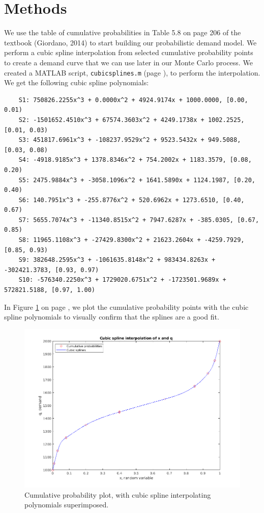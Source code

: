 \documentclass{article}
\begin{document}
    \section*{Methods}
    We use the table of cumulative probabilities in Table 5.8 on page 206 of the textbook (Giordano, 2014) to start building our probabilistic demand model. We perform a cubic spline interpolation from selected cumulative probability points to create a demand curve that we can use later in our Monte Carlo process. We created a MATLAB script, \texttt{cubicsplines.m} (page \pageref{code:cubicsplines}), to perform the interpolation. We get the following cubic spline polynomials:
    \begin{verbatim}
    S1: 750826.2255x^3 + 0.0000x^2 + 4924.9174x + 1000.0000, [0.00, 0.01)
    S2: -1501652.4510x^3 + 67574.3603x^2 + 4249.1738x + 1002.2525, [0.01, 0.03)
    S3: 451817.6961x^3 + -108237.9529x^2 + 9523.5432x + 949.5088, [0.03, 0.08)
    S4: -4918.9185x^3 + 1378.8346x^2 + 754.2002x + 1183.3579, [0.08, 0.20)
    S5: 2475.9884x^3 + -3058.1096x^2 + 1641.5890x + 1124.1987, [0.20, 0.40)
    S6: 140.7951x^3 + -255.8776x^2 + 520.6962x + 1273.6510, [0.40, 0.67)
    S7: 5655.7074x^3 + -11340.8515x^2 + 7947.6287x + -385.0305, [0.67, 0.85)
    S8: 11965.1108x^3 + -27429.8300x^2 + 21623.2604x + -4259.7929, [0.85, 0.93)
    S9: 382648.2595x^3 + -1061635.8148x^2 + 983434.8263x + -302421.3783, [0.93, 0.97)
    S10: -576340.2250x^3 + 1729020.6751x^2 + -1723501.9689x + 572821.5188, [0.97, 1.00)\end{verbatim}
    In Figure \ref{fig:cubicsplines} on page \pageref{fig:cubicsplines}, we plot the cumulative probability points with the cubic spline polynomials to visually confirm that the splines are a good fit.
    \begin{figure}[p]
        \centering
        \includegraphics[width=\textwidth]{img/cubicsplines.png}
        \caption{Cumulative probability plot, with cubic spline interpolating polynomials superimposed.}
        \label{fig:cubicsplines}
    \end{figure}
\end{document}
